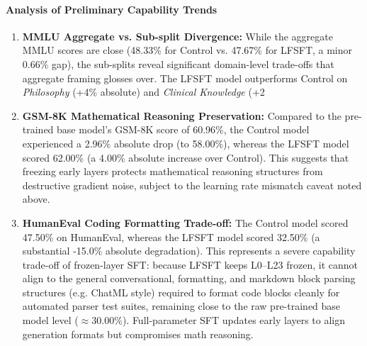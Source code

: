 \documentclass[11pt]{article}
\begin{document}
\paragraph{Analysis of Preliminary Capability Trends}
\begin{enumerate}
    \item \textbf{MMLU Aggregate vs. Sub-split Divergence:} While the aggregate MMLU scores are close (48.33\% for Control vs. 47.67\% for LFSFT, a minor 0.66\% gap), the sub-splits reveal significant domain-level trade-offs that aggregate framing glosses over. The LFSFT model outperforms Control on \textit{Philosophy} (+4\% absolute) and \textit{Clinical Knowledge} (+2%
    \item \textbf{GSM-8K Mathematical Reasoning Preservation:} Compared to the pre-trained base model's GSM-8K score of 60.96\%, the Control model experienced a 2.96\% absolute drop (to 58.00\%), whereas the LFSFT model scored 62.00\% (a 4.00\% absolute increase over Control). This suggests that freezing early layers protects mathematical reasoning structures from destructive gradient noise, subject to the learning rate mismatch caveat noted above.
    \item \textbf{HumanEval Coding Formatting Trade-off:} The Control model scored 47.50\% on HumanEval, whereas the LFSFT model scored 32.50\% (a substantial -15.0\% absolute degradation). This represents a severe capability trade-off of frozen-layer SFT: because LFSFT keeps L0--L23 frozen, it cannot align to the general conversational, formatting, and markdown block parsing structures (e.g. ChatML style) required to format code blocks cleanly for automated parser test suites, remaining close to the raw pre-trained base model level ($\approx 30.00\%$). Full-parameter SFT updates early layers to align generation formats but compromises math reasoning.
\end{enumerate}
\end{document}
